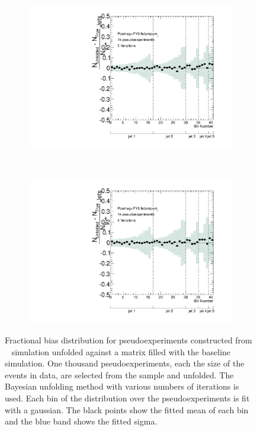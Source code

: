 \begin{figure}
\begin{subfigure}[]{0.5\textwidth}
\includegraphics[width=\textwidth]{fig/Stress/110404atlfast/FracBias3Iterations.pdf}
\end{subfigure}
~
\begin{subfigure}[]{0.5\textwidth}
\includegraphics[width=\textwidth]{fig/Stress/110404atlfast/FracBias4Iterations.pdf}
\end{subfigure}
\caption{Fractional bias distribution for pseudoexperiments constructed from \newline \hdamp~ simulation unfolded against a matrix filled with the baseline simulation. One thousand pseudoexperiments, each the size of the events in data, are selected from the sample and unfolded. The Bayesian unfolding method with various numbers of iterations is used. Each bin of the distribution over the pseudoexperiments is fit with a gaussian. The black points show the fitted mean of each bin and the blue band shows the fitted sigma. }
\label{fig:hdampfrbias}
\end{figure}
